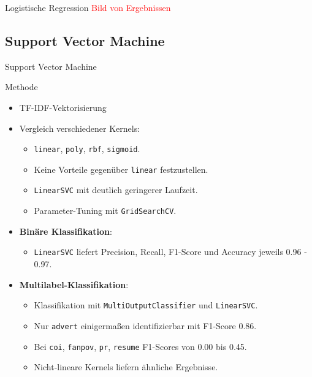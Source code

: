 \documentclass[aspectratio=169]{beamer} %
\begin{document}
\begin{frame}{Logistische Regression}
    \textcolor{red}{Bild von Ergebnissen}
\end{frame}

\subsection{Support Vector Machine}

\begin{frame}{Support Vector Machine
}
    \begin{block}{Methode}
        \begin{itemize}
            \item TF-IDF-Vektorisierung
            \item Vergleich verschiedener Kernels:
                \begin{itemize}
                    \item \texttt{linear}, \texttt{poly}, \texttt{rbf}, \texttt{sigmoid}.
                    \item Keine Vorteile gegen\"uber \texttt{linear} festzustellen.
                    \item \texttt{LinearSVC} mit deutlich geringerer Laufzeit.
                    \item Parameter-Tuning mit \texttt{GridSearchCV}.
                \end{itemize}
            \item \textbf{Bin\"are Klassifikation}:
                \begin{itemize}
                    \item \texttt{LinearSVC} liefert Precision, Recall, F1-Score und Accuracy jeweils 0.96 - 0.97.
                \end{itemize}
            \item \textbf{Multilabel-Klassifikation}:
                \begin{itemize}
                    \item Klassifikation mit \texttt{MultiOutputClassifier} und \texttt{LinearSVC}.
                    \item Nur \texttt{advert} einigerma\ss{}en identifizierbar mit F1-Score 0.86.
                    \item Bei \texttt{coi}, \texttt{fanpov}, \texttt{pr}, \texttt{resume} F1-Scores von 0.00 bis 0.45.
                    \item Nicht-lineare Kernels liefern \"ahnliche Ergebnisse.
                \end{itemize}
        \end{itemize}
    \end{block}
\end{frame}
\end{document}
